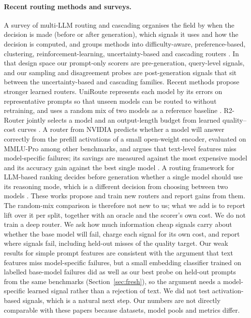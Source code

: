 \documentclass[11pt]{article}
\begin{document}
\paragraph{Recent routing methods and surveys.} A survey of multi-LLM routing and cascading organises the field by when the decision is made (before or after generation), which signals it uses and how the decision is computed, and groups methods into difficulty-aware, preference-based, clustering, reinforcement-learning, uncertainty-based and cascading routers \cite{moslem2026routingsurvey}. In that design space our prompt-only scorers are pre-generation, query-level signals, and our sampling and disagreement probes are post-generation signals that sit between the uncertainty-based and cascading families. Recent methods propose stronger learned routers. UniRoute represents each model by its errors on representative prompts so that unseen models can be routed to without retraining, and uses a random mix of two models as a reference baseline \cite{jitkrittum2025uniroute}. R2-Router jointly selects a model and an output-length budget from learned quality--cost curves \cite{xue2026r2router}. A router from NVIDIA predicts whether a model will answer correctly from the prefill activations of a small open-weight encoder, evaluated on MMLU-Pro among other benchmarks, and argues that text-level features miss model-specific failures; its savings are measured against the most expensive model and its accuracy gain against the best single model \cite{varshney2026prefill}. A routing framework for LLM-based ranking decides before generation whether a single model should use its reasoning mode, which is a different decision from choosing between two models \cite{guo2026modelaware}. These works propose and train new routers and report gains from them. The random-mix comparison is therefore not new to us; what we add is to report lift over it per split, together with an oracle and the scorer's own cost. We do not train a deep router. We ask how much information cheap signals carry about whether the base model will fail, charge each signal for its own cost, and report where signals fail, including held-out misses of the quality target. Our weak results for simple prompt features are consistent with the argument that text features miss model-specific failures, but a small embedding classifier trained on labelled base-model failures did as well as our best probe on held-out prompts from the same benchmarks (Section~\ref{sec:fresh}), so the argument needs a model-specific learned signal rather than a rejection of text. We did not test activation-based signals, which is a natural next step. Our numbers are not directly comparable with these papers because datasets, model pools and metrics differ.
\end{document}
